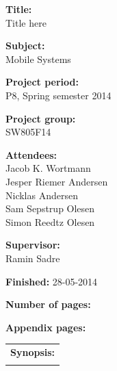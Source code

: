 \begin{titlingpage}
\begin{nopagebreak}
{\noindent\begin{minipage}[c]{0.4\textwidth}
	\begin{flushleft} 
	\begin{description}	
\item {\textbf{Title:}}\\
Title here
\item {\textbf{Subject:}}\\
Mobile Systems
\item {\textbf{Project period:}}\\
   P8, Spring semester 2014\\
\item {\textbf{Project group:}}\\
  SW805F14\\
\item {\textbf{Attendees:}}\\
Jacob K. Wortmann \\
Jesper Riemer Andersen \\
Nicklas Andersen \\
Sam Sepstrup Olesen \\
Simon Reedtz Olesen \\

\item {\textbf{Supervisor:}}\\
Ramin Sadre \\
\end{description}

\begin{description}
\item {\textbf{Finished:}} 28-05-2014
\item {\textbf{Number of pages:}} \pageref{lastpage}
\item {\textbf{Appendix pages:}} 
\end{description}
\vfill
	\end{flushleft}
\end{minipage}
\begin{minipage}[c]{0.6\textwidth}
	\begin{flushright} 
		  \vspace{.15cm}
  \hfill 
  \begin{tabular}{l}
  {\textbf{Synopsis:}}\bigskip \\
  \fbox{
    \parbox{5.5cm}{\bigskip
     {\vfill{\small 
     \bigskip}}
     }}
   \end{tabular}
	\end{flushright}
\end{minipage}
\\\\%
}
\end{nopagebreak}
\end{titlingpage}
